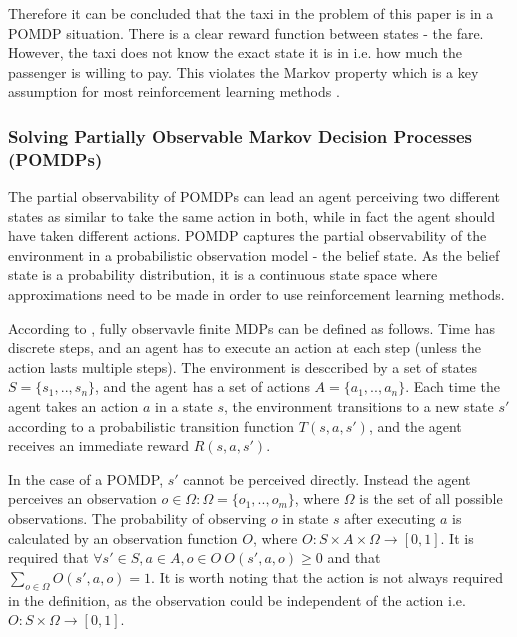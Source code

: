 Therefore it can be concluded that the taxi in the problem of this paper is in
a POMDP situation. There is a clear reward function between states - the fare.
However, the taxi does not know the exact state it is in i.e. how much the
passenger is willing to pay. This violates the Markov property which is a key
assumption for most reinforcement learning methods
\parencite{Sutton1998ai+reinforcement}.

\subsubsection{Solving Partially Observable Markov Decision Processes (POMDPs)}
\label{sec:ai:pomdp}

The partial observability of POMDPs can lead an agent perceiving two different
states as similar to take the same action in both, while in fact the agent
should have taken different actions. POMDP captures the partial observability
of the environment in a probabilistic observation model - the belief state. As
the belief state is a probability distribution, it is a continuous state space
where approximations need to be made in order to use reinforcement learning
methods. \parencite{Russell2010ai+modern}

According to \textcite{Wiering2012ai+reinforcement}, fully observavle finite
MDPs can be defined as follows. Time has discrete steps, and an agent has to
execute an action at each step (unless the action lasts multiple steps). The
environment is desccribed by a set of states \(S = \{s_1,..,s_n\}\), and the
agent has a set of actions \(A = \{a_1,..,a_n\}\). Each time the agent takes an
action \(a\) in a state \(s\), the environment transitions to a new state
\(s'\) according to a probabilistic transition function \(T(s,a,s')\), and the
agent receives an immediate reward \(R(s,a,s')\).

In the case of a POMDP, \(s'\) cannot be perceived directly. Instead the agent
perceives an observation \(o \in \Omega : \Omega = \{o_1,..,o_m\}\), where
\(\Omega\) is the set of all possible observations. The probability of
observing \(o\) in state \(s\) after executing \(a\) is calculated by an
observation function \(O\), where \(O : S \times A \times \Omega \rightarrow
[0,1] \). It is required that \(\forall s' \in S, a \in A, o \in O ~ O (s', a,
o) \geq 0 \) and that \(\sum_{o \in \Omega}^{} O (s', a, o) = 1 \). It is worth
noting that the action is not always required in the definition, as the
observation could be independent of the action i.e. \(O : S \times \Omega
\rightarrow [0,1] \). \parencite{Wiering2012ai+reinforcement}

